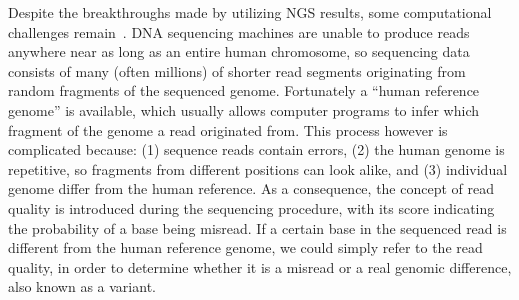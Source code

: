 \documentclass{PHlab-thesis}
\begin{document}
Despite the breakthroughs made by utilizing NGS results, some computational challenges remain~\cite{muzzey2015understanding}.  DNA sequencing machines are unable to produce reads anywhere near as long as an entire human chromosome, so sequencing data consists of many (often millions) of shorter read segments originating from random fragments of the sequenced genome.  Fortunately a ``human reference genome'' is available, which usually allows computer programs to infer which fragment of the genome a read originated from.  This process however is complicated because: (1) sequence reads contain errors, (2) the human genome is repetitive, so fragments from different positions can look alike, and (3) individual genome differ from the human reference. As a consequence, the concept of read quality is introduced during the sequencing procedure, with its score indicating the probability of a base being misread. If a certain base in the sequenced read is different from the human reference genome, we could simply refer to the read quality, in order to determine whether it is a misread or a real genomic difference, also known as a variant.
\end{document}
